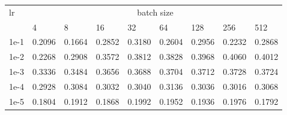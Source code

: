\documentclass[
  convert={
    density=300,
    outext=.png
  },border=5pt
]{standalone}
\begin{document}
\begin{tabular}{|l|l|l|l|l|l|l|l|l|}
\hline
\multirow{2}{*}{lr} & \multicolumn{8}{c|}{batch size}                                       \\ \cline{2-9} 
                    & 4      & 8      & 16     & 32     & 64     & 128    & 256    & 512    \\ \hline
1e-1                & 0.2096 & 0.1664 & 0.2852 & 0.3180 & 0.2604 & 0.2956 & 0.2232 & 0.2868 \\ \hline
1e-2                & 0.2268 & 0.2908 & 0.3572 & 0.3812 & 0.3828 & 0.3968 & 0.4060 & 0.4012 \\ \hline
1e-3                & 0.3336 & 0.3484 & 0.3656 & 0.3688 & 0.3704 & 0.3712 & 0.3728 & 0.3724 \\ \hline
1e-4                & 0.2928 & 0.3084 & 0.3032 & 0.3040 & 0.3136 & 0.3036 & 0.3016 & 0.3068 \\ \hline
1e-5                & 0.1804 & 0.1912 & 0.1868 & 0.1992 & 0.1952 & 0.1936 & 0.1976 & 0.1792 \\ \hline
\end{tabular}
\end{document}

